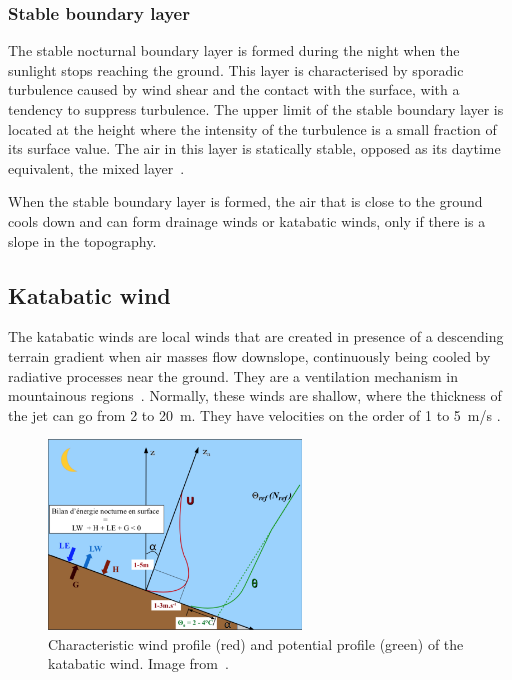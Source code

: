 \documentclass[a4paper,12pt]{article}
\begin{document}
\subsubsection{Stable boundary layer}
The stable nocturnal boundary layer is formed during the night when the sunlight stops reaching the ground. This layer is characterised by sporadic turbulence caused by wind shear and the contact with the surface, with a tendency to suppress turbulence. The upper limit of the stable boundary layer is located at the height where the intensity of the turbulence is a small fraction of its surface value. The air in this layer is statically stable, opposed as its daytime equivalent, the mixed layer~\citep{stull2012introduction}.

When the stable boundary layer is formed, the air that is close to the ground cools down and can form drainage winds or katabatic winds, only if there is a slope in the topography.

\subsection{Katabatic wind}

The katabatic winds are local winds that are created in presence of a descending terrain gradient when air masses flow downslope, continuously being cooled by radiative processes near the ground. They are a ventilation mechanism in mountainous regions~\citep{manins1979model}. Normally, these winds are shallow, where the thickness of the jet can go from 2 to 20~m. They have velocities on the order of 1 to 5~m/s \citep{stull2012introduction}. 

\begin{figure}[ht!]
	\vspace{-5pt}
    \centering
\includegraphics[width=0.6\textwidth]{fig/profiles_katabatic_wind.png}
    \caption{Characteristic wind profile (red) and potential profile (green) of the katabatic wind. Image from~\cite{claudine}.}
    \label{fig:u_profile}
  \vspace{-5pt}
\end{figure}
\end{document}
